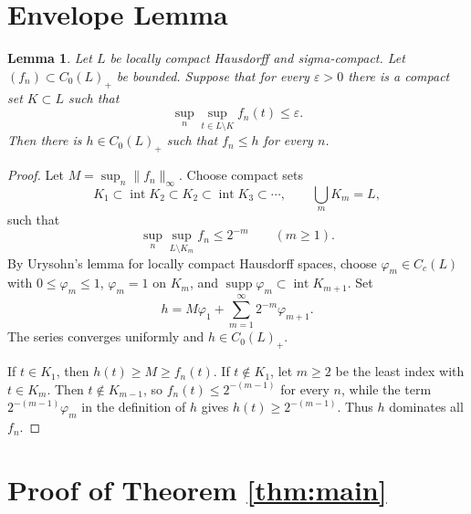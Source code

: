 \documentclass[11pt]{article}
\newtheorem{lemma}{Lemma}
\newcommand{\supp}{\operatorname{supp}}
\begin{document}
\section*{Envelope Lemma}

\begin{lemma}
\label{lem:envelope}
Let \(L\) be locally compact Hausdorff and sigma-compact.  Let
\((f_n)\subset C_0(L)_+\) be bounded.  Suppose that for every \(\varepsilon>0\)
there is a compact set \(K\subset L\) such that
\[
  \sup_n\sup_{t\in L\setminus K} f_n(t)\le \varepsilon .
\]
Then there is \(h\in C_0(L)_+\) such that \(f_n\le h\) for every \(n\).
\end{lemma}

\begin{proof}
Let \(M=\sup_n\|f_n\|_\infty\).  Choose compact sets
\[
  K_1\subset \operatorname{int}K_2\subset K_2\subset
  \operatorname{int}K_3\subset\cdots,\qquad \bigcup_m K_m=L,
\]
such that
\[
  \sup_n\sup_{L\setminus K_m} f_n\le 2^{-m}\qquad(m\ge1).
\]
By Urysohn's lemma for locally compact Hausdorff spaces, choose
\(\varphi_m\in C_c(L)\) with \(0\le\varphi_m\le1\),
\(\varphi_m=1\) on \(K_m\), and
\(\supp\varphi_m\subset \operatorname{int}K_{m+1}\).
Set
\[
  h=M\varphi_1+\sum_{m=1}^{\infty}2^{-m}\varphi_{m+1}.
\]
The series converges uniformly and \(h\in C_0(L)_+\).

If \(t\in K_1\), then \(h(t)\ge M\ge f_n(t)\).  If \(t\notin K_1\), let
\(m\ge2\) be the least index with \(t\in K_m\).  Then
\(t\notin K_{m-1}\), so \(f_n(t)\le2^{-(m-1)}\) for every \(n\), while the
term \(2^{-(m-1)}\varphi_m\) in the definition of \(h\) gives
\(h(t)\ge2^{-(m-1)}\).  Thus \(h\) dominates all \(f_n\).
\end{proof}

\section*{Proof of Theorem \ref{thm:main}}
\end{document}
